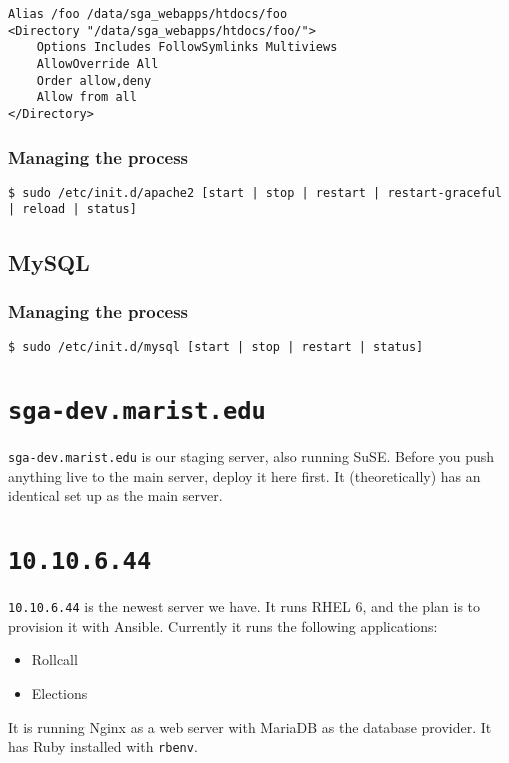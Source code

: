 \documentclass[11pt]{report}
\begin{document}
				\begin{lstlisting}
Alias /foo /data/sga_webapps/htdocs/foo
<Directory "/data/sga_webapps/htdocs/foo/">
	Options Includes FollowSymlinks Multiviews
	AllowOverride All
	Order allow,deny
	Allow from all
</Directory>
				\end{lstlisting}


			\subsubsection{Managing the process}
				\begin{lstlisting}
$ sudo /etc/init.d/apache2 [start | stop | restart | restart-graceful | reload | status]
				\end{lstlisting}

		\subsection{MySQL}
			\subsubsection{Managing the process}
				\begin{lstlisting}
$ sudo /etc/init.d/mysql [start | stop | restart | status]
				\end{lstlisting}

	\section{\texttt{sga-dev.marist.edu}}
		\texttt{sga-dev.marist.edu} is our staging server, also running SuSE. Before you push anything live to the main server, deploy it here first. It (theoretically) has an identical set up as the main server.

	\section{\texttt{10.10.6.44}}
		\texttt{10.10.6.44} is the newest server we have. It runs RHEL 6, and the plan is to provision it with Ansible. Currently it runs the following applications:

			\begin{itemize}
				\item Rollcall
				\item Elections
			\end{itemize}

			It is running Nginx as a web server with MariaDB as the database provider. It has Ruby installed with \texttt{rbenv}.
		
\end{document}
